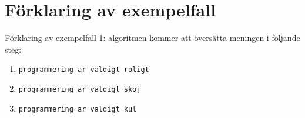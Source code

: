 \section*{Förklaring av exempelfall}
Förklaring av exempelfall 1: algoritmen kommer att översätta meningen i följande steg:

\begin{enumerate}
    \item \texttt{programmering ar valdigt roligt}
    \item \texttt{programmering ar valdigt skoj}
    \item \texttt{programmering ar valdigt kul}
\end{enumerate}